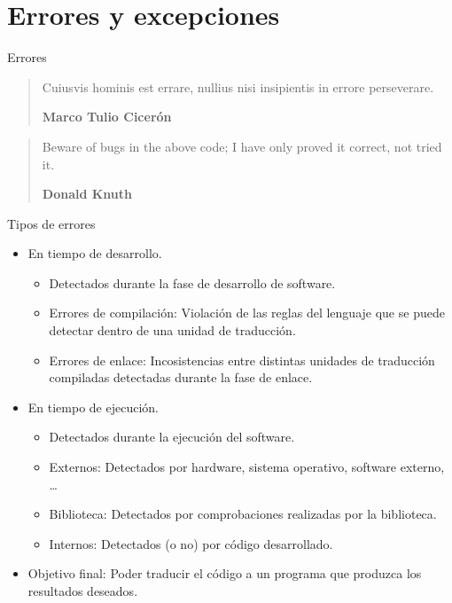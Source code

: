 \section{Errores y excepciones}

\begin{frame}{Errores}
\begin{quote}
Cuiusvis hominis est errare, nullius nisi insipientis in errore perseverare.

\textbf{Marco Tulio Cicerón}
\end{quote}

\pause

\begin{quote}
Beware of bugs in the above code; I have only proved it correct, not tried it.

\textbf{Donald Knuth}
\end{quote}
\end{frame}


\begin{frame}{Tipos de errores}
\begin{itemize}
  \item En tiempo de desarrollo.
    \begin{itemize}
      \item Detectados durante la fase de desarrollo de software.
      \item \alert{Errores de compilación}: Violación de las reglas del lenguaje que
      se puede detectar dentro de una unidad de traducción.
      \item \alert{Errores de enlace}: Incosistencias entre distintas unidades de 
      traducción compiladas detectadas durante la fase de enlace.
    \end{itemize}

  \item En tiempo de ejecución.
    \begin{itemize}
      \item Detectados durante la ejecución del software.
      \item \alert{Externos}: Detectados por hardware, sistema operativo, software externo, \ldots
      \item \alert{Biblioteca}: Detectados por comprobaciones realizadas por la biblioteca.
      \item \alert{Internos}: Detectados (o no) por código desarrollado.
    \end{itemize}

  \item{Objetivo final}: Poder traducir el código a un programa que produzca los resultados deseados.
\end{itemize}
\end{frame}

